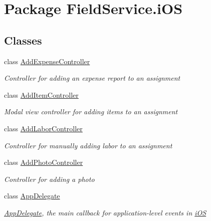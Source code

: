 \hypertarget{namespace_field_service_1_1i_o_s}{\section{Package Field\+Service.\+i\+O\+S}
\label{namespace_field_service_1_1i_o_s}
}
\subsection*{Classes}
\begin{DoxyCompactItemize}
\item 
class \hyperlink{class_field_service_1_1i_o_s_1_1_add_expense_controller}{Add\+Expense\+Controller}
\begin{DoxyCompactList}\small\item\em Controller for adding an expense report to an assignment \end{DoxyCompactList}\item 
class \hyperlink{class_field_service_1_1i_o_s_1_1_add_item_controller}{Add\+Item\+Controller}
\begin{DoxyCompactList}\small\item\em Modal view controller for adding items to an assignment \end{DoxyCompactList}\item 
class \hyperlink{class_field_service_1_1i_o_s_1_1_add_labor_controller}{Add\+Labor\+Controller}
\begin{DoxyCompactList}\small\item\em Controller for manually adding labor to an assignment \end{DoxyCompactList}\item 
class \hyperlink{class_field_service_1_1i_o_s_1_1_add_photo_controller}{Add\+Photo\+Controller}
\begin{DoxyCompactList}\small\item\em Controller for adding a photo \end{DoxyCompactList}\item 
class \hyperlink{class_field_service_1_1i_o_s_1_1_app_delegate}{App\+Delegate}
\begin{DoxyCompactList}\small\item\em \hyperlink{class_field_service_1_1i_o_s_1_1_app_delegate}{App\+Delegate}, the main callback for application-\/level events in \hyperlink{namespace_field_service_1_1i_o_s}{i\+O\+S} \end{DoxyCompactList}\item 

\end{DoxyCompactItemize}
